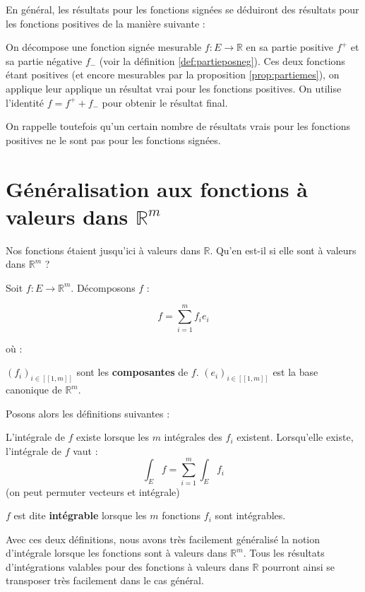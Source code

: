 \documentclass[../integ-proba.tex]{subfiles}
\begin{document}
  En général, les résultats pour les fonctions signées se déduiront des résultats pour les fonctions positives de la manière suivante :
  \begin{itemize}
    \itemb On décompose une fonction signée mesurable $f:E\longrightarrow\mathbb{R}$ en sa partie positive $f^+$ et sa partie négative $f_-$ (voir la définition \ref{def:partieposneg}).
    \itemb Ces deux fonctions étant positives (et encore mesurables par la proposition \ref{prop:partiemes}), on applique leur applique un résultat vrai pour les fonctions positives.
    \itemb On utilise l'identité $f=f^++f_-$ pour obtenir le résultat final.
  \end{itemize}

  On rappelle toutefois qu'un certain nombre de résultats vrais pour les fonctions positives ne le sont pas pour les fonctions signées.


  \section{Généralisation aux fonctions à valeurs dans $\mathbb{R}^m$}

  Nos fonctions étaient jusqu'ici à valeurs dans $\mathbb{R}$. Qu'en est-il si elle sont à valeurs dans $\mathbb{R}^m$ ?

  Soit $f:E\longrightarrow \mathbb{R}^m$. Décomposons $f$ :

  $$
  f = \sum_{i=1}^{m}f_ie_i
  $$

  où :
  \begin{itemize}
    \itemb $\left(f_i\right)_{i\in[\![1,m]\!]}$ sont les \textbf{composantes} de $f$.
    \itemb $\left(e_i\right)_{i\in[\![1,m]\!]}$ est la base canonique de $\mathbb{R}^m$.
  \end{itemize}

  Posons alors les définitions suivantes :

  \begin{defi}
    L'intégrale de $f$ existe lorsque les $m$ intégrales des $f_i$ existent.
    Lorsqu'elle existe, l'intégrale de $f$ vaut :
    $$
    \int_Ef = \sum_{i=1}^{m}\int_Ef_i
    $$
    (on peut permuter vecteurs et intégrale)
  \end{defi}

  \begin{defi}
    $f$ est dite \textbf{intégrable} lorsque les $m$ fonctions $f_i$ sont intégrables.
  \end{defi}

  Avec ces deux définitions, nous avons très facilement généralisé la notion d'intégrale lorsque les fonctions sont à valeurs dans $\mathbb{R}^m$.
  Tous les résultats d'intégrations valables pour des fonctions à valeurs dans $\mathbb{R}$ pourront ainsi se transposer très facilement dans le cas général.
\end{document}
